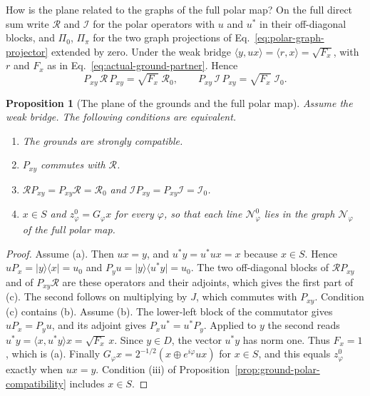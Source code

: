 \documentclass[11pt]{article}
\newtheorem{proposition}{Proposition}[section]
\theoremstyle{definition}
\newcommand{\ket}[1]{\lvert #1\rangle}
\newcommand{\bra}[1]{\langle #1\rvert}
\begin{document}
How is the plane related to the graphs of the full polar map? On the full direct sum write $\mathcal R$ and $\mathcal I$ for the polar operators with $u$ and $u^*$ in their off-diagonal blocks, and $\Pi_0$, $\Pi_\pi$ for the two graph projections of Eq.~\eqref{eq:polar-graph-projector} extended by zero. Under the weak bridge $\langle y,ux\rangle=\langle r,x\rangle=\sqrt{F_x}$, with $r$ and $F_x$ as in Eq.~\eqref{eq:actual-ground-partner}. Hence
\begin{equation}
 P_{xy}\,\mathcal R\,P_{xy}=\sqrt{F_x}\;\mathcal R_0,\qquad
 P_{xy}\,\mathcal I\,P_{xy}=\sqrt{F_x}\;\mathcal I_0 .
 \label{eq:ground-plane-compression}
\end{equation}

\begin{proposition}[The plane of the grounds and the full polar map]
\label{prop:ground-plane-reduction}
Assume the weak bridge. The following conditions are equivalent.
\begin{enumerate}
\item[(a)] The grounds are strongly compatible.
\item[(b)] $P_{xy}$ commutes with $\mathcal R$.
\item[(c)] $\mathcal RP_{xy}=P_{xy}\mathcal R=\mathcal R_0$ and $\mathcal IP_{xy}=P_{xy}\mathcal I=\mathcal I_0$.
\item[(d)] $x\in S$ and $z^0_\varphi=G_\varphi x$ for every $\varphi$, so that each line $\mathcal N^0_\varphi$ lies in the graph $\mathcal N_\varphi$ of the full polar map.
\end{enumerate}
\end{proposition}
\begin{proof}
Assume (a). Then $ux=y$, and $u^*y=u^*ux=x$ because $x\in S$. Hence $uP_x=\ket{y}\!\bra{x}=u_0$ and $P_yu=\ket{y}\!\bra{u^*y}=u_0$. The two off-diagonal blocks of $\mathcal RP_{xy}$ and of $P_{xy}\mathcal R$ are these operators and their adjoints, which gives the first part of (c). The second follows on multiplying by $J$, which commutes with $P_{xy}$. Condition (c) contains (b). Assume (b). The lower-left block of the commutator gives $uP_x=P_yu$, and its adjoint gives $P_xu^*=u^*P_y$. Applied to $y$ the second reads $u^*y=\langle x,u^*y\rangle x=\sqrt{F_x}\,x$. Since $y\in D$, the vector $u^*y$ has norm one. Thus $F_x=1$, which is (a). Finally $G_\varphi x=2^{-1/2}(x\oplus e^{i\varphi}ux)$ for $x\in S$, and this equals $z^0_\varphi$ exactly when $ux=y$. Condition (iii) of Proposition~\ref{prop:ground-polar-compatibility} includes $x\in S$.
\end{proof}
\end{document}
